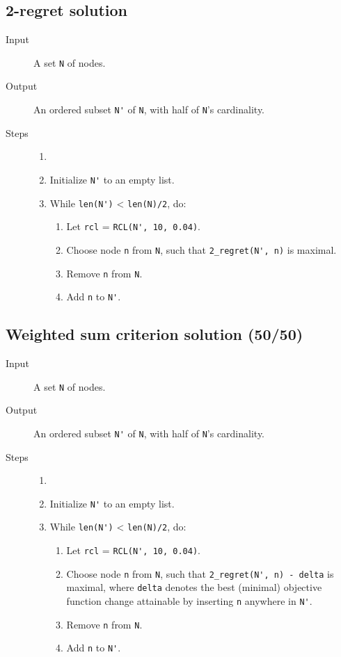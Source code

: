 \documentclass[14pt]{article}
\begin{document}
\subsection{2-regret solution}
\begin{description}
	\item [Input] A set \verb`N` of nodes.
	\item [Output] An ordered subset \verb`N'` of \verb`N`, with half of
		\verb`N`'s cardinality.
	\item [Steps]
		\begin{enumerate}\item []
			\item Initialize \verb`N'` to an empty list.
			\item While \verb`len(N')` < \verb`len(N)/2`, do:
				\begin{enumerate}
					\item Let \verb`rcl` = \verb`RCL(N', 10, 0.04)`.
					\item Choose node \verb`n` from \verb`N`, such that
						\verb`2_regret(N', n)` is maximal.
					\item Remove \verb`n` from \verb`N`.
					\item Add \verb`n` to \verb`N'`.
				\end{enumerate}
		\end{enumerate}
\end{description}

\subsection{Weighted sum criterion solution (50/50)}
\begin{description}
	\item [Input] A set \verb`N` of nodes.
	\item [Output] An ordered subset \verb`N'` of \verb`N`, with half of
		\verb`N`'s cardinality.
	\item [Steps]
		\begin{enumerate}\item []
			\item Initialize \verb`N'` to an empty list.
			\item While \verb`len(N')` < \verb`len(N)/2`, do:
				\begin{enumerate}
					\item Let \verb`rcl` = \verb`RCL(N', 10, 0.04)`.
					\item Choose node \verb`n` from \verb`N`, such that
						\verb`2_regret(N', n) - delta` is maximal, where
						\verb`delta` denotes the best (minimal) objective
						function change attainable by inserting \verb`n`
						anywhere in \verb`N'`.
					\item Remove \verb`n` from \verb`N`.
					\item Add \verb`n` to \verb`N'`.
				\end{enumerate}
		\end{enumerate}
\end{description}
\end{document}
